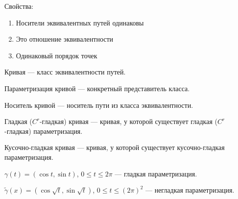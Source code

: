     Свойства:
    \begin{enumerate}
    
        \item Носители эквивалентных путей одинаковы

        \item Это отношение эквивалентности

        \item Одинаковый порядок точек

    \end{enumerate}

    \begin{Def}

        Кривая --- класс эквивалентности путей.
   
    \end{Def}

    \begin{Def}
  
        Параметризация кривой --- конкретный представитель класса.
    
    \end{Def}

    \begin{Def}
  
        Носитель кривой --- носитель пути из класса эквивалентности.
    
    \end{Def}

    \begin{Def}
  
        Гладкая ($C^r$-гладкая) кривая --- кривая, у которой существует гладкая ($C^r$-гладкая) параметризация.
    
    \end{Def}

    \begin{Def}
    
        Кусочно-гладкая кривая --- кривая, у которой существует кусочно-гладкая параметризация.
    
    \end{Def}
    
    \begin{exmp}
   
        $\gamma(t) = (\cos t, \sin t)$, $0 \le t \le 2\pi$ --- гладкая параметризация.

        $\widetilde{\gamma}(x) = (\cos \sqrt{t}, \sin\sqrt{t})$, $0 \le t \le (2\pi)^2$ --- негладкая параметризация.
    
    \end{exmp}

